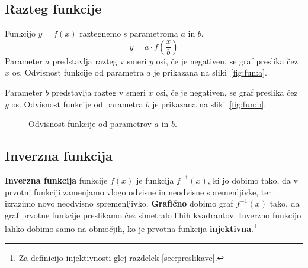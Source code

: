 \documentclass[a4paper,oneside,12pt,fleqn]{article}
\newcommand\krat\cdot
\newcommand{\beforecaptionskip}{\vspace{-12pt}}
\numberwithin{equation}{section}
\begin{document}
\subsection{Razteg funkcije}
\label{sec:fun:razt}
Funkcijo $y = f(x)$ raztegnemo s parametroma $a$ in $b$.
\[ y = a \krat f\left( \frac{x}{b} \right) \]
Parameter $a$ predstavlja razteg v smeri $y$ osi, če je negativen, se graf preslika čez
$x$ os. Odvisnost funkcije od parametra $a$ je prikazana na sliki~\ref{fig:fun:a}.

Parameter $b$ predstavlja razteg v smeri $x$ osi, če je negativen, se graf
preslika čez $y$ os. Odvisnost funkcije od parametra $b$ je prikazana na sliki~\ref{fig:fun:b}.

\begin{figure}[ht]
  \begin{center}
  \end{center}
  \beforecaptionskip
  \caption{Odvisnost funkcije od parametrov $a$ in $b$.}
  \label{fig:fun:ab}
\end{figure}

\subsection{Inverzna funkcija}
\label{sec:fun:inv}
\textbf{Inverzna funkcija} funkcije $f(x)$ je funkcija $f^{-1}(x)$, ki jo dobimo tako, da v prvotni
funkciji zamenjamo vlogo odvisne in neodvisne spremenljivke, ter izrazimo novo neodvisno
spremenljivko. \textbf{Grafično} dobimo graf $f^{-1}(x)$ tako, da graf prvotne funkcije preslikamo
čez simetralo lihih kvadrantov. Inverzno funkcijo lahko dobimo samo na območjih, ko je
prvotna funkcija \textbf{injektivna}.\footnote{Za definicijo injektivnosti glej razdelek
\ref{sec:preslikave}.}
\end{document}

